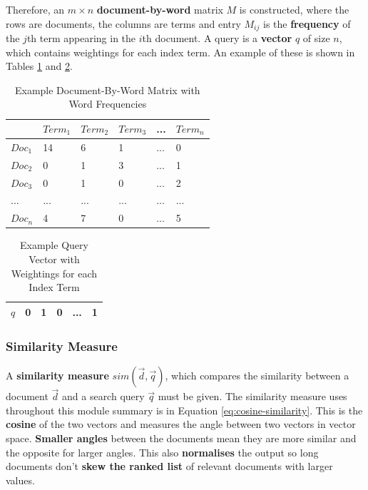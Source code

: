\documentclass{article}
\begin{document}
Therefore, an $m \times n$ \textbf{document-by-word} matrix $M$ is constructed, where the rows are documents, the columns are terms and entry $M_{ij}$ is the \textbf{frequency} of the $j$th term appearing in the $i$th document. A query is a \textbf{vector} $q$ of size $n$, which contains weightings for each index term. An example of these is shown in Tables \ref{tab:doc-by-word-vector-space} and \ref{tab:query-vector-space}.

\begin{table}[H]
	\centering
	\begin{tabular}{|p{1cm}|p{1cm}p{1cm}p{1cm}p{1cm}p{1cm}|}
	\hline
	& $Term_1$ & $Term_2$ & $Term_3$ & ... & $Term_n$ \\
	\hline
	$Doc_1$ & 14 & 6 & 1 & ... & 0 \\
	$Doc_2$ & 0 & 1 & 3 & ... & 1 \\
	$Doc_3$ & 0 & 1 & 0 & ... & 2 \\
	... & ... & ... & ... & ... & ... \\
	$Doc_n$ & 4 & 7 & 0 & ... & 5 \\
	\hline
	\end{tabular}
	\caption{Example Document-By-Word Matrix with Word Frequencies}
	\label{tab:doc-by-word-vector-space}
\end{table}

\begin{table}[H]
	\centering
	\begin{tabular}{|p{1cm}|p{1cm}p{1cm}p{1cm}p{1cm}p{1cm}|}
	\hline
	$q$ & 0 & 1 & 0 & ... & 1 \\
	\hline
	\end{tabular}
	\caption{Example Query Vector with Weightings for each Index Term}
	\label{tab:query-vector-space}
\end{table}

\subsubsection{Similarity Measure}

A \textbf{similarity measure} $sim(\vec{d}, \vec{q})$, which compares the similarity between a document $\vec{d}$ and a search query $\vec{q}$ must be given. The similarity measure uses throughout this module summary is in Equation \ref{eq:cosine-similarity}. This is the \textbf{cosine} of the two vectors and measures the angle between two vectors in vector space. \textbf{Smaller angles} between the documents mean they are more similar and the opposite for larger angles. This also \textbf{normalises} the output so long documents don't \textbf{skew the ranked list} of relevant documents with larger values.
\end{document}
